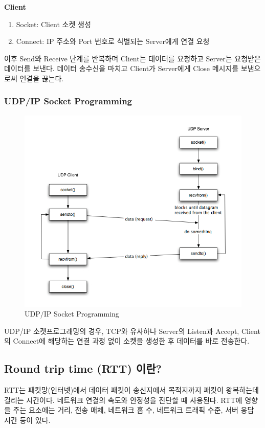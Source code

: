     \textbf{Client}
    \begin{enumerate}
        \item Socket: Client 소켓 생성
        \item Connect: IP 주소와 Port 번호로 식별되는 Server에게 연결 요청
    \end{enumerate}
    이후 Send와 Receive 단계를 반복하며 Client는 데이터를 요청하고 Server는 요청받은 데이터를 보낸다. 데이터 송수신을 마치고 Client가 Server에게 Close 메시지를 보냄으로써 연결을 끊는다. \\
    
\newpage  
    \subsubsection*{UDP/IP Socket Programming}
    \vspace{-4mm}
    \begin{figure}[!h]\centering
		\includegraphics[width=.65\textwidth]{image/week07/1-4.png}
		\caption{\small UDP/IP Socket Programming}
		\vspace{-10pt}
    \end{figure}
    UDP/IP 소켓프로그래밍의 경우, TCP와 유사하나 Server의 Listen과 Accept, Client의 Connect에 해당하는 연결 과정 없이 소켓을 생성한 후 데이터를 바로 전송한다. \\
    
\subsection{Round trip time (RTT) 이란?}    
    RTT는 패킷망(인터넷)에서 데이터 패킷이 송신지에서 목적지까지 패킷이 왕복하는데 걸리는 시간이다. 네트워크 연결의 속도와 안정성을 진단할 때 사용된다. RTT에 영향을 주는 요소에는 거리, 전송 매체, 네트워크 홉 수, 네트워크 트래픽 수준, 서버 응답 시간 등이 있다. \\

